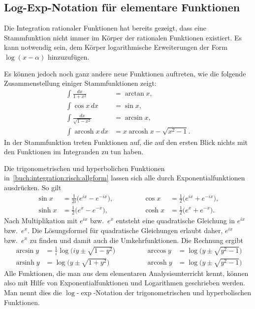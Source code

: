 %
%
%
\subsection{Log-Exp-Notation für elementare Funktionen
\label{buch:integral:subsection:logexp}}
Die Integration rationaler Funktionen hat bereits gezeigt, dass
eine Stammfunktion nicht immer im Körper der rationalen Funktionen
existiert.
Es kann notwendig sein, dem Körper logarithmische Erweiterungen der Form
$\log(x-\alpha)$ hinzuzufügen.

Es können jedoch noch ganz andere neue Funktionen auftreten, wie die
folgende Zusammenstellung einiger Stammfunktionen zeigt:
\begin{equation}
\begin{aligned}
\int\frac{dx}{1+x^2}
&=
\arctan x,
\\
\int \cos x\,dx
&=
\sin x,
\\
\int\frac{dx}{\sqrt{1-x^2}}
&=
\arcsin x,
\\
\int
\operatorname{arcosh} x\,dx
&=
x \operatorname{arcosh} x - \sqrt{x^2-1}.
\end{aligned}
\label{buch:integration:risch:allgform}
\end{equation}
In der Stammfunktion treten Funktionen auf, die auf den ersten
Blick nichts mit den Funktionen im Integranden zu tun haben.

Die trigonometrischen und hyperbolichen Funktionen
in~\eqref{buch:integration:risch:allgform}
lassen sich alle durch Exponentialfunktionen ausdrücken.
So gilt
\begin{equation}
\begin{aligned}
\sin x &= \frac{1}{2i}\bigl( e^{ix} - e^{-ix}\bigr),
&
&\qquad&
\cos x &= \frac{1}{2}\bigl( e^{ix} + e^{-ix}\bigr),
\\
\sinh x &= \frac12\bigl( e^x - e^{-x} \bigr),
&
&\qquad&
\cosh x &= \frac12\bigl( e^x + e^{-x} \bigr).
\end{aligned}
\label{buch:integral:risch:trighypinv}
\end{equation}
Nach Multiplikation mit $e^{ix}$ bzw.~$e^{x}$ entsteht eine
quadratische Gleichung in $e^{ix}$ bzw.~$e^{x}$.
Die Lösungsformel für quadratische Gleichungen erlaubt daher, $e^{ix}$
bzw.~$e^{x}$ zu finden und damit auch die Umkehrfunktionen.
Die Rechnung ergibt
\begin{equation}
\begin{aligned}
\arcsin y
&=
\frac{1}{i}\log\bigl(
iy\pm\sqrt{1-y^2}
\bigr)
&
&\qquad&
\arccos y
&=
\log\bigl(
y\pm \sqrt{y^2-1}
\bigr)
\\
\operatorname{arsinh}y
&=
\log\bigl(
y \pm \sqrt{1+y^2}
\bigr)
&
&\qquad&
\operatorname{arcosh} y
&=
\log\bigl(
y\pm \sqrt{y^2-1}
\bigr)
\end{aligned}
\label{buch:integral:risch:trighypinv}
\end{equation}
Alle Funktionen, die man aus dem elementaren Analysisunterricht
kennt, können also mit Hilfe von Exponentialfunktionen und Logarithmen
geschrieben werden.
Man nennt dies die $\log$-$\exp$-Notation der trigonometrischen
und hyperbolischen Funktionen.
%

